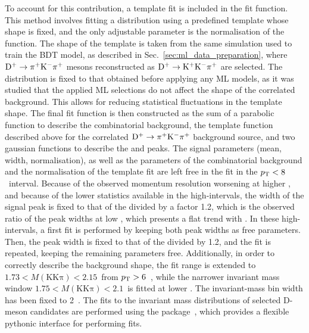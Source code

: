 To account for this contribution, a template fit is included in the fit function. This method involves fitting a distribution using a predefined template whose shape is fixed, and the only adjustable parameter is the normalisation of the function. The shape of the template is taken from the same simulation used to train the BDT model, as described in Sec.~\ref{sec:ml_data_preparation}, where $\mathrm{D^+}\rightarrow\mathrm{\pi^+K^-\pi^+}$ mesons reconstructed as $\mathrm{D^+}\rightarrow\mathrm{K^+K^-\pi^+}$ are selected. The distribution is fixed to that obtained before applying any ML models, as it was studied that the applied ML selections do not affect the shape of the correlated background. This allows for reducing statistical fluctuations in the template shape. The final fit function is then constructed as the sum of a parabolic function to describe the combinatorial background, the template function described above for the correlated $\mathrm{D^+}\rightarrow\mathrm{\pi^+K^-\pi^+}$ background source, and two gaussian functions to describe the \ds and \dpl peaks. The signal parameters (mean, width, normalisation), as well as the parameters of the combinatorial background and the normalisation of the template fit are left free in the fit in the $p_\mathrm{T}<8$~\gevc interval. Because of the observed momentum resolution worsening at higher \pt, and because of the lower statistics available in the high-\pt intervals, the width of the \dpl signal peak is fixed to that of the \ds divided by a factor 1.2, which is the observed ratio of the peak widths at low \pt, which presents a flat trend with \pt. In these high-\pt intervals, a first fit is performed by keeping both peak widths as free parameters. Then, the \dpl peak width is fixed to that of the \ds divided by 1.2, and the fit is repeated, keeping the remaining parameters free. Additionally, in order to correctly describe the background shape, the fit range is extended to $1.73<M(\mathrm{KK\pi})<2.15$~\gevcc from $p_\mathrm{T}>6$~\gevc, while the narrower invariant mass window $1.75<M(\mathrm{KK\pi})<2.1$~\gevcc is fitted at lower \pt. The invariant-mass bin width has been fixed to 2~\mevcc. The fits to the invariant mass distributions of selected D-meson candidates are performed using the  package~\cite{grosa_2023_7579657}, which provides a flexible pythonic interface for performing fits. 


